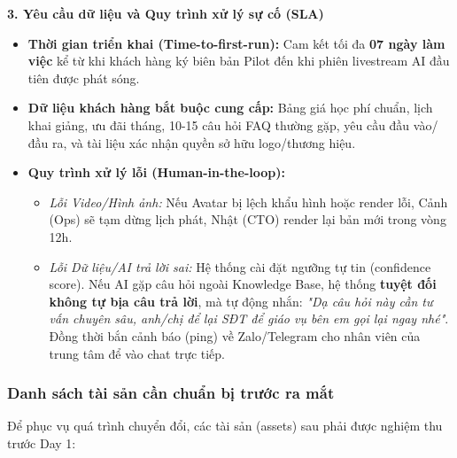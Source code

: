 \textbf{3. Yêu cầu dữ liệu và Quy trình xử lý sự cố (SLA)}
\begin{itemize}
    \item \textbf{Thời gian triển khai (Time-to-first-run):} Cam kết tối đa \textbf{07 ngày làm việc} kể từ khi khách hàng ký biên bản Pilot đến khi phiên livestream AI đầu tiên được phát sóng.
    \item \textbf{Dữ liệu khách hàng bắt buộc cung cấp:} Bảng giá học phí chuẩn, lịch khai giảng, ưu đãi tháng, 10-15 câu hỏi FAQ thường gặp, yêu cầu đầu vào/đầu ra, và tài liệu xác nhận quyền sở hữu logo/thương hiệu.
    \item \textbf{Quy trình xử lý lỗi (Human-in-the-loop):}
    \begin{itemize}
        \item \textit{Lỗi Video/Hình ảnh:} Nếu Avatar bị lệch khẩu hình hoặc render lỗi, Cảnh (Ops) sẽ tạm dừng lịch phát, Nhật (CTO) render lại bản mới trong vòng 12h.
        \item \textit{Lỗi Dữ liệu/AI trả lời sai:} Hệ thống cài đặt ngưỡng tự tin (confidence score). Nếu AI gặp câu hỏi ngoài Knowledge Base, hệ thống \textbf{tuyệt đối không tự bịa câu trả lời}, mà tự động nhắn: \textit{"Dạ câu hỏi này cần tư vấn chuyên sâu, anh/chị để lại SĐT để giáo vụ bên em gọi lại ngay nhé"}. Đồng thời bắn cảnh báo (ping) về Zalo/Telegram cho nhân viên của trung tâm để vào chat trực tiếp.
    \end{itemize}
\end{itemize}

\subsubsection{Danh sách tài sản cần chuẩn bị trước ra mắt}

Để phục vụ quá trình chuyển đổi, các tài sản (assets) sau phải được nghiệm thu trước Day 1:

